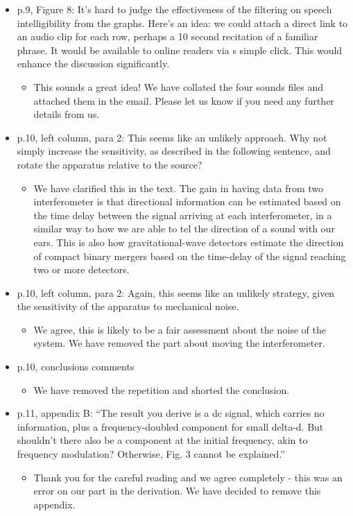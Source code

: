 \documentclass[a4paper, 10pt]{letter}
\begin{document}
\begin{itemize}
\item p.9, Figure 8: It's hard to judge the effectiveness of the filtering on speech intelligibility from the graphs. Here's an idea: we could attach a direct link to an audio clip for each row, perhaps a 10 second recitation of a familiar phrase. It would be available to online readers via s simple click. This would enhance the discussion significantly.
\begin{itemize}
\item This sounds a great idea! We have collated the four sounds files and attached them in the email. Please let us know if you need any further details from us. 
\end{itemize}

\item p.10, left column, para 2: This seems like an unlikely approach. Why not simply increase the sensitivity, as described in the following sentence, and rotate the apparatus relative to the source?
\begin{itemize}
\item We have clarified this in the text. The gain in having data from two interferometer is that directional information can be estimated based on the time delay between the signal arriving at each interferometer, in a similar way to how we are able to tel the direction of a sound with our ears. This is also how gravitational-wave detectors estimate the direction of compact binary mergers based on the time-delay of the signal reaching two or more detectors. 
\end{itemize}

\item p.10, left column, para 2: Again, this seems like an unlikely strategy, given the sensitivity of the apparatus to mechanical noise. 
\begin{itemize}
\item We agree, this is likely to be a fair assessment about the noise of the system. We have removed the part about moving the interferometer. 
\end{itemize}

\item p.10, conclusions comments
\begin{itemize}
\item We have removed the repetition and shorted the conclusion. 
\end{itemize}

\item p.11, appendix B: ``The result you derive is a dc signal, which carries no information, plus a frequency-doubled component for small delta-d. But shouldn't there also be a component at the initial frequency, akin to frequency modulation? Otherwise, Fig. 3 cannot be explained.''
\begin{itemize}
\item Thank you for the careful reading and we agree completely - this was an error on our part in the derivation. We have decided to remove this appendix. 
\end{itemize}


\end{itemize}
\end{document}
